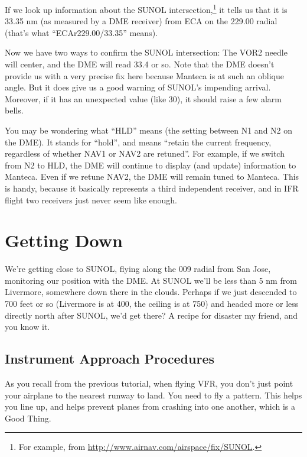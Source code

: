 If we look up information about the SUNOL intersection,\footnote{For
  example, from \url{http://www.airnav.com/airspace/fix/SUNOL}.} it
tells us that it is 33.35 nm (as measured by a DME receiver) from ECA
on the 229.00 radial (that's what ``ECAr229.00/33.35'' means).

Now we have two ways to confirm the SUNOL intersection: The VOR2
needle will center, and the DME will read 33.4 or so.  Note that the
DME doesn't provide us with a very precise fix here because Manteca is
at such an oblique angle.  But it does give us a good warning of
SUNOL's impending arrival.  Moreover, if it has an unexpected value
(like 30), it should raise a few alarm bells.


You may be wondering what ``HLD'' means (the setting between N1 and N2
on the DME).  It stands for ``hold'', and means ``retain the current
frequency, regardless of whether NAV1 or NAV2 are retuned''.  For
example, if we switch from N2 to HLD, the DME will continue to display
(and update) information to Manteca.  Even if we retune NAV2, the DME
will remain tuned to Manteca.  This is handy, because it basically
represents a third independent receiver, and in IFR flight two
receivers just never seem like enough.

\section{Getting Down}

We're getting close to SUNOL, flying along the 009 radial from San
Jose, monitoring our position with the DME.  At SUNOL we'll be less
than 5 nm from Livermore, somewhere down there in the clouds.  Perhaps
if we just descended to 700 feet or so (Livermore is at 400, the
ceiling is at 750) and headed more or less directly north after SUNOL,
we'd get there?  A recipe for disaster my friend, and you know it.

\subsection{Instrument Approach Procedures}

As you recall from the previous tutorial, when flying VFR, you don't
just point your airplane to the nearest runway to land.  You need to
fly a pattern.  This helps you line up, and helps prevent planes from
crashing into one another, which is a Good Thing.


